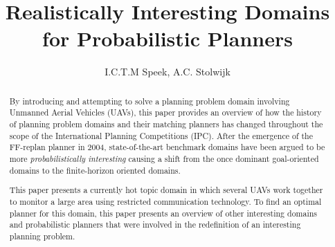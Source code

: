 \documentclass[runningheads,a4paper]{llncs}
\begin{document}
\mainmatter%

\title{Realistically Interesting Domains for Probabilistic Planners}


\author{I.C.T.M Speek, A.C. Stolwijk}

%



\maketitle



\begin{abstract}
By introducing and attempting to solve a planning problem domain involving Unmanned Aerial Vehicles (UAVs), this paper provides an overview of how the history of planning problem domains and their matching planners has changed throughout the scope of the International Planning Competitions (IPC). After the emergence of the FF-replan planner in 2004, state-of-the-art benchmark domains have been argued to be more \emph{probabilistically interesting} causing a shift from the once dominant goal-oriented domains to the finite-horizon oriented domains. 

This paper presents a currently hot topic domain in which several UAVs  work together to monitor a large area using restricted communication technology. To find an optimal planner for this domain, this paper presents an overview of other interesting domains and probabilistic planners that were involved in the redefinition of an interesting planning problem. 

\end{abstract}
\end{document}

